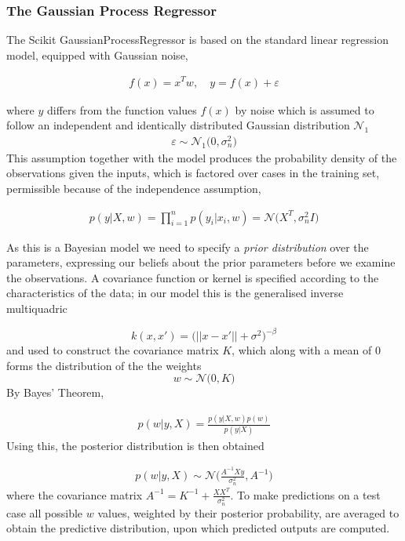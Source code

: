 \documentclass[12pt,a4paper]{article}
\begin{document}
\subsubsection{The Gaussian Process Regressor}

The Scikit GaussianProcessRegressor is based on the 
standard linear regression 
model, equipped with Gaussian noise,

\begin{align} 
    f(x) = x^{T}w, \quad{y = f(x) + \varepsilon}
\end{align}

where $y$ differs from the function values $f(x)$ by noise which is assumed
to follow an independent and identically distributed Gaussian distribution
$\mathcal{N}_1$
\begin{align*}
    \varepsilon \sim \mathcal{N}_1 \bigl(0, \sigma_{n}^2\bigr)
\end{align*}
This assumption together with the model produces the 
probability density of the observations given the inputs, 
which is factored over cases in the training set, 
permissible because of the independence assumption,

\begin{align}
    p(y|X,w) = \prod_{i=1}^{n} p(y_i|x_i ,w) = \mathcal{N}\bigl(X^T, \sigma_{n}^2 I\bigr)
\end{align}

As this is a Bayesian model we need to specify a \textit{prior distribution} over the parameters, 
expressing our beliefs about the prior
parameters before we examine the observations. A covariance function or kernel
is specified according to the characteristics of the data; in our model this 
is the generalised inverse multiquadric

$$ k(x,x') = \biggl( ||x-x'|| + \sigma^2\biggr)^{-\beta} $$
and used to construct the covariance matrix $K$, which along with 
a mean of $0$ forms the distribution of the the weights 
$$ w \sim \mathcal{N}\bigl(0, K\bigr)$$
By Bayes' Theorem, 

\begin{align}
    p(w|y, X) = \frac{p(y|X,w) p(w)}{p(y|X)}
\end{align}
Using this, the posterior distribution is then obtained

\begin{align}
    p(w|y, X) \sim \mathcal{N}\bigl(\frac{A^{-1}Xy}{\sigma_{n}^{2}}, A^{-1}\bigr)
\end{align}
where the covariance matrix $A^{-1} = K^{-1} + \frac{XX^T}{\sigma_{n}^2}$.
To make predictions on a test case all possible $w$
values, weighted by their posterior probability, are averaged to obtain the
predictive distribution, upon which predicted outputs are computed.
\end{document}
